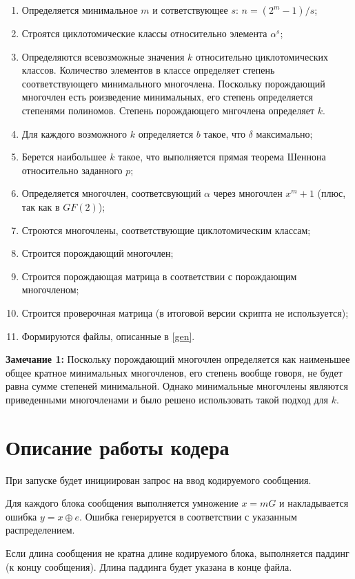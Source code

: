 \documentclass{article}
\begin{document}
\begin{enumerate}
\item Определяется минимальное $m$ и сответствующее $s$: $n = (2^m - 1)/s$;
\item Строятся циклотомические классы относительно элемента $\alpha^s$;
\item Определяются всевозможные значения $k$ относительно циклотомических классов.
Количество элементов в классе определяет степень соответствующего минимального многочлена.
Поскольку порождающий многочлен есть роизведение минимальных, его степень определяется степенями полиномов.
Степень порождающего мнгочлена определяет $k$.
\item Для каждого возможного $k$ определяется $b$ такое, что $\delta$ максимально;
\item Берется наибольшее $k$ такое, что выполняется прямая теорема Шеннона относительно заданного $p$;
\item Определяется многочлен, соответсвующий $\alpha$ через многочлен $x^m + 1$ (плюс, так как в $GF(2)$);
\item Строются многочлены, соответствующие циклотомическим классам;
\item Строится порождающий многочлен;
\item Строится порождающая матрица в соответствии с порождающим многочленом;
\item Строится проверочная матрица (в итоговой версии скрипта не используется);
\item Формируются файлы, описанные в \ref{gen}.
\end{enumerate}

\textbf{Замечание 1:}
Поскольку порождающий многочлен определяется как наименьшее общее кратное минимальных многочленов, его степень вообще говоря, не будет равна сумме степеней минимальной.
Однако минимальные многочлены являются приведенными многочленами и было решено использовать такой подход для $k$.

\section{Описание работы кодера}

При запуске будет инициирован запрос на ввод кодируемого сообщения.

Для каждого блока сообщения выполняется умножение $x = mG$ и накладывается ошибка $y = x \oplus e$.
Ошибка генерируется в соответствии с указанным распределением.

Если длина сообщения не кратна длине кодируемого блока, выполняется паддинг (к концу сообщения). Длина паддинга будет указана в конце файла.
\end{document}
